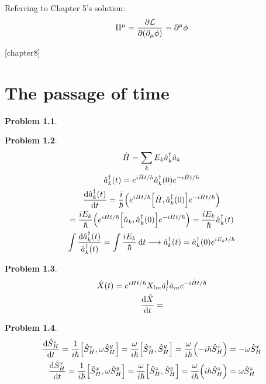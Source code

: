 \documentclass{report}
\theoremstyle{definition}
\begin{document}
\begin{chapter7}
	Referring to Chapter 5's solution:
	\begin{gather*}
		\Pi^{\mu} = \pdv{\mathcal{L}}{\pqty{\partial_{\mu}\phi}} = \partial^{\mu}\phi
	\end{gather*}
\end{chapter7}

\newtheorem{chapter8}{Problem}
[chapter8]
\chapter{The passage of time}

\begin{chapter8}
	
\end{chapter8}

\begin{chapter8}
	\begin{gather*}
		\hat{H} = \sum_k E_k \hat{a}_k^\dagger \hat{a}_k \\
		\hat{a}^{\dagger}_{k}(t) = e^{i\hat{H}t/\hbar}\hat{a}^{\dagger}_{k}(0)e^{-i\hat{H}t/\hbar} \\
		\dv{\hat{a}^{\dagger}_{k}(t)}{t} = \frac{i}{\hbar}\pqty{e^{i\hat{H}t/\hbar}\bqty{\hat{H},\hat{a}^{\dagger}_{k}(0)}e^{-i\hat{H}t/\hbar}} \\
		= \frac{iE_k}{\hbar}\pqty{e^{i\hat{H}t/\hbar}\bqty{\hat{n}_k,\hat{a}^{\dagger}_{k}(0)}e^{-i\hat{H}t/\hbar}} = \frac{iE_k}{\hbar}\hat{a}^{\dagger}_{k}(t) \\
		\int \frac{\dd{\hat{a}^{\dagger}_{k}(t)}}{\hat{a}^{\dagger}_{k}(t)} = \int \frac{iE_k}{\hbar}\dd{t} \longrightarrow \hat{a}^{\dagger}_{k}(t) = \hat{a}^{\dagger}_{k}(0)e^{iE_kt/\hbar}
	\end{gather*}
\end{chapter8}

\begin{chapter8}
	\begin{gather*}
		\hat{X}(t) = e^{i\hat{H}t/\hbar}X_{lm}\hat{a}^{\dagger}_l \hat{a}_m e^{-i\hat{H}t/\hbar} \\
		\dv{\hat{X}}{t} = 
	\end{gather*}	
\end{chapter8}

\begin{chapter8}
	\begin{gather*}
		\dv{\hat{S}^z_H}{t} = \frac{1}{i\hbar}\bqty{\hat{S}^z_H,\omega\hat{S}^y_H} = \frac{\omega}{i\hbar}\bqty{\hat{S}^z_H,\hat{S}^y_H} = \frac{\omega}{i\hbar}\pqty{-i\hbar\hat{S}^x_H} = -\omega\hat{S}^x_H \\
		\dv{\hat{S}^x_H}{t} = \frac{1}{i\hbar}\bqty{\hat{S}^x_H,\omega\hat{S}^y_H} = \frac{\omega}{i\hbar}\bqty{\hat{S}^z_H,\hat{S}^y_H} = \frac{\omega}{i\hbar}\pqty{i\hbar\hat{S}^z_H} = \omega\hat{S}^z_H 
	\end{gather*}
\end{chapter8}
\end{document}
